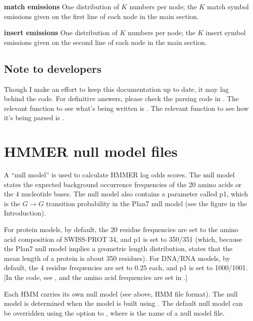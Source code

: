 \begin{wideitem}
\item [\textbf{match emissions}] One distribution of $K$ numbers
per node; the $K$ match symbol emissions given on the first line of
each node in the main section.

\item [\textbf{insert emissions}] One distribution of $K$ numbers
per node; the $K$ insert symbol emissions given on the second line of
each node in the main section.

\end{wideitem}

\subsection{Note to developers}

Though I make an effort to keep this documentation up to date, it may
lag behind the code. For definitive answers, please check the parsing
code in . The relevant function to see what's being
written is . The relevant function to see how it's
being parsed is .


\section{HMMER null model files}

A ``null model'' is used to calculate HMMER log odds scores. The null
model states the expected background occurrence frequencies of the 20
amino acids or the 4 nucleotide bases. The null model also contains a
parameter called p1, which is the $G \rightarrow G$ transition
probability in the Plan7 null model (see the figure in the
Introduction).

For protein models, by default, the 20 residue frequencies are set to
the amino acid composition of SWISS-PROT 34, and p1 is set to 350/351
(which, because the Plan7 null model implies a geometric length
distribution, states that the mean length of a protein is about 350
residues). For DNA/RNA models, by default, the 4 residue frequencies
are set to 0.25 each, and p1 is set to 1000/1001.  [In the code, see
, and the amino acid frequencies are
set in .]

Each HMM carries its own null model (see above, HMM file format).  The
null model is determined when the model is built using
. The default null model can be overridden using
the  option to , where  is
the name of a null model file.  

